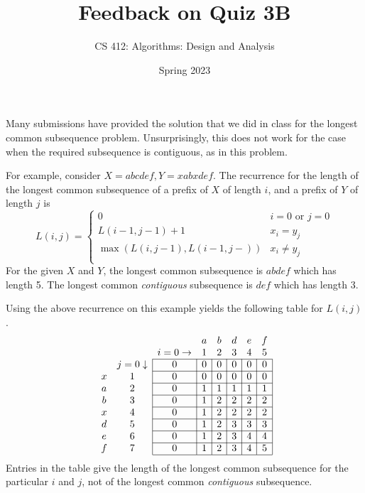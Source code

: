 \documentclass[a4paper]{exam}
\title{Feedback on Quiz 3B}
\author{CS 412: Algorithms: Design and Analysis}
\date{Spring 2023}
\newcommand\mc{\multicolumn}
\newcommand\mcs[1]{\multicolumn{1}{c}{#1}}
\newcommand\mcb[1]{\multicolumn{1}{c|}{#1}}
\begin{document}
\maketitle
\thispagestyle{empty}

Many submissions have provided the solution that we did in class for the longest common subsequence problem. Unsurprisingly, this does not work for the case when the required subsequence is contiguous, as in this problem.

For example, consider $X=abcdef, Y=xabxdef$. The recurrence for the length of the longest common subsequence of a prefix of $X$ of length $i$, and a prefix of $Y$ of length $j$ is
\[
  L(i,j) =
  \begin{cases}
    0 & i = 0 \text{ or } j = 0\\
    L(i-1, j-1) + 1 & x_i = y_j\\
    \max(L(i, j-1), L(i-1, j-)) & x_i \neq y_j\\
  \end{cases}
\]
For the given $X$ and $Y$, the longest common subsequence is $abdef$ which has length 5. The longest common \textit{contiguous} subsequence is $def$ which has length 3.

Using the above recurrence on this example yields the following table for $L(i,j)$.
\[
\begin{array}{*8{c|}}
  \mc{3}{c}{} & \mcs{a} & \mcs{b} & \mcs{d} & \mcs{e} & \mcs{f} \\
  \mc{2}{c}{} & \mcs{i=0\rightarrow} & \mcs{1} & \mcs{2} & \mcs{3} & \mcs{4} & \mcs{5} \\\cline{3-8}
  \mcs{ } & \mcb{j=0\downarrow} & 0 & 0 & 0 & 0 & 0 & 0 \\\cline{3-8}
  \mcs{x} & \mcb{1} & 0 & 0 & 0 & 0 & 0 & 0 \\\cline{3-8}
  \mcs{a} & \mcb{2} & 0 & 1 & 1 & 1 & 1 & 1 \\\cline{3-8}
  \mcs{b} & \mcb{3} & 0 & 1 & 2 & 2 & 2 & 2 \\\cline{3-8}
  \mcs{x} & \mcb{4} & 0 & 1 & 2 & 2 & 2 & 2 \\\cline{3-8}
  \mcs{d} & \mcb{5} & 0 & 1 & 2 & 3 & 3 & 3 \\\cline{3-8}
  \mcs{e} & \mcb{6} & 0 & 1 & 2 & 3 & 4 & 4 \\\cline{3-8}
  \mcs{f} & \mcb{7} & 0 & 1 & 2 & 3 & 4 & 5 \\\cline{3-8}
\end{array}
\]
Entries in the table give the length of the longest common subsequence for the particular $i$ and $j$, not of the longest common \textit{contiguous} subsequence.
\end{document}
